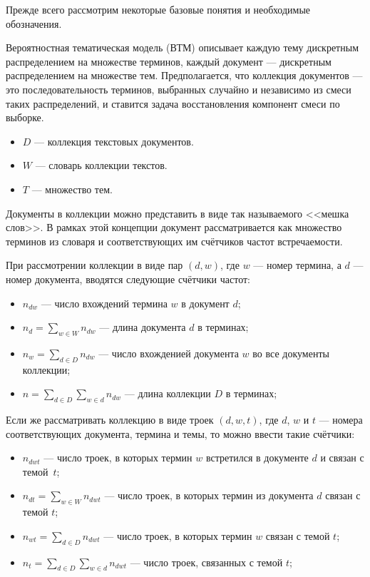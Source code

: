 
Прежде всего рассмотрим некоторые базовые понятия и необходимые обозначения.

Вероятностная тематическая модель (ВТМ) описывает каждую тему дискретным распределением на множестве терминов, каждый документ --- дискретным распределением на множестве тем. Предполагается, что коллекция документов --- это последовательность терминов, выбранных случайно и независимо из смеси таких распределений, и ставится задача восстановления компонент смеси по выборке.

\begin{itemize}
	\item $D$ --- коллекция текстовых документов.
	\item $W$ --- словарь коллекции текстов.
	\item $T$ --- множество тем.
\end{itemize}

Документы в коллекции можно представить в виде так называемого <<мешка слов>>. В рамках этой концепции документ рассматривается как множество терминов из словаря и соответствующих им счётчиков частот встречаемости.

При рассмотрении коллекции в виде пар $(d, w)$, где $w$ --- номер термина, а $d$ --- номер документа, вводятся следующие счётчики частот:

\begin{itemize}
	\item $n_{dw}$ --- число вхождений термина $w$ в документ $d$;
	\item $n_d = \sum_{w \in W} n_{dw}$ --- длина документа $d$ в терминах;
	\item $n_w = \sum_{d \in D} n_{dw}$ --- число вхожденией документа $w$ во все документы коллекции;
	\item $n = \sum_{d \in D}\sum_{w \in d} n_{dw}$ --- длина коллекции $D$ в терминах; 
\end{itemize}

Если же рассматривать коллекцию в виде троек $(d, w, t)$, где $d$, $w$ и $t$ --- номера соответствующих документа, термина и темы, то можно ввести такие счётчики: 

\begin{itemize}
	\item $n_{dwt}$ --- число троек, в которых термин $w$ встретился в документе $d$ и связан с темой~$t$;
	\item $n_{dt} = \sum_{w \in W} n_{dwt}$ --- число троек, в которых термин из документа $d$ связан с темой $t$;
	\item $n_{wt} = \sum_{d \in D} n_{dwt}$ --- число троек, в которых термин $w$ связан с темой $t$;
	\item $n_t = \sum_{d \in D}\sum_{w \in d} n_{dwt}$ --- число троек, связанных с темой $t$;
\end{itemize}

